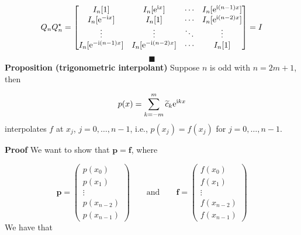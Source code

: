 \documentclass[12pt,landscape]{article}
\begin{document}
{\[
Q_n Q_n^\ensuremath{\star}  = \begin{bmatrix} I_n[1] & I_n[{\rm e}^{{\rm i} x}] & \ensuremath{\cdots} & I_n[{\rm e}^{{\rm i} (n-1) x}] \\
                            I_n[{\rm e}^{-{\rm i} x}] & I_n[1] & \ensuremath{\cdots} & I_n[{\rm e}^{{\rm i} (n-2) x}] \\
                            \ensuremath{\vdots} & \ensuremath{\vdots} & \ensuremath{\ddots} & \ensuremath{\vdots} \\
                            I_n[{\rm e}^{-{\rm i}(n-1) x}] & I_n[{\rm e}^{-{\rm i}(n-2) x}] & \ensuremath{\cdots} & I_n[1]
                            \end{bmatrix} = I
\]
\[
\blacksquare
\]
\textbf{Proposition (trigonometric interpolant)} Suppose $n$ is odd with $n = 2m+1$, then 

\[
p(x) = \sum_{k=-m}^{m}\widetilde{c}_{k}{\rm e}^{{\rm i}kx}
\]
interpolates $f$ at $x_j$, $j = 0, \ldots, n-1$, i.e., $p(x_j) = f(x_j)$ for $j = 0, \ldots, n-1$.

\textbf{Proof}  We want to show that $\mathbf{p} = \mathbf{f}$, where 

\[
\mathbf{p} = \left(
\begin{array}{c}
p(x_0) \\
p(x_1) \\
\vdots \\
p(x_{n-2}) \\
p(x_{n-1})
\end{array}
\right) \qquad \text{and} \qquad 
\mathbf{f} = \left(
\begin{array}{c}
f(x_0) \\
f(x_1) \\
\vdots \\
f(x_{n-2}) \\
f(x_{n-1})
\end{array}
\right)
\]
We have that

}
\end{document}
